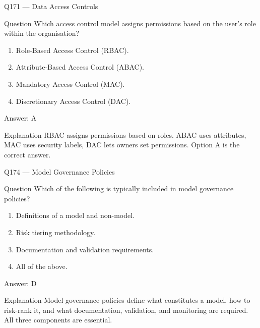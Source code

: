 \documentclass[aspectratio=169,8pt]{beamer}
\begin{document}
\begin{frame}{Q171 --- Data Access Controls}
\begin{block}{Question}
Which access control model assigns permissions based on the user's role within the organisation?
\begin{enumerate}
\item Role-Based Access Control (RBAC).
\item Attribute-Based Access Control (ABAC).
\item Mandatory Access Control (MAC).
\item Discretionary Access Control (DAC).
\end{enumerate}  \end{block}
\begin{exampleblock}{Answer: A}\end{exampleblock}
\begin{block}{Explanation}
RBAC assigns permissions based on roles. ABAC uses attributes, MAC uses security labels, DAC lets owners set permissions. Option A is the correct answer.
\end{block}
\end{frame}




\begin{frame}{Q174 --- Model Governance Policies}
\begin{block}{Question}
Which of the following is typically included in model governance policies?
\begin{enumerate}
\item Definitions of a model and non-model.
\item Risk tiering methodology.
\item Documentation and validation requirements.
\item All of the above.
\end{enumerate}  \end{block}
\begin{exampleblock}{Answer: D}\end{exampleblock}
\begin{block}{Explanation}
Model governance policies define what constitutes a model, how to risk-rank it, and what documentation, validation, and monitoring are required. All three components are essential.
\end{block}
\end{frame}
\end{document}
